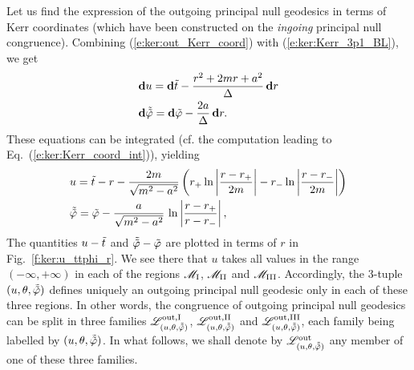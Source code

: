 Let us find
the expression of the outgoing principal null geodesics in terms of
Kerr coordinates (which have been constructed on the
\emph{ingoing} principal null congruence).
Combining (\ref{e:ker:out_Kerr_coord}) with (\ref{e:ker:Kerr_3p1_BL}),
we get
\begin{subequations}
\label{e:ker:out_Kerr_Kerr_3p1}
\begin{align}
& \mathbf{d} u = \mathbf{d} {\tilde t} - \frac{r^2 + 2m r + a^2}{\Delta} \, \mathbf{d} r \\
& \mathbf{d} \tilde{{\tilde\varphi}} = \mathbf{d} {\tilde\varphi} - \frac{2a}{\Delta}\, \mathbf{d} r .
\end{align}
\end{subequations}
These equations can be integrated (cf. the computation leading to Eq.~(\ref{e:ker:Kerr_coord_int})), yielding
\begin{subequations}
\label{e:ker:out_princ_geod}
\begin{align}
& u = {\tilde t} - r - \frac{2m}{\sqrt{m^2-a^2}} \left(
    r_+ \ln\left| \frac{r-r_+}{2m} \right|
    - r_- \ln\left| \frac{r-r_-}{2m} \right| \right) \label{e:ker:out_princ_geod_u} \\
&  \tilde{{\tilde\varphi}} = {\tilde\varphi} - \frac{a}{\sqrt{m^2-a^2}}\, \ln \left|
    \frac{r-r_+}{r-r_-} \right|  ,  \label{e:ker:out_princ_geod_ttph}
\end{align}
\end{subequations}
The quantities $u - {\tilde t}$ and $\tilde{{\tilde\varphi}} - {\tilde\varphi}$ are plotted in terms of
$r$ in Fig.~\ref{f:ker:u_ttphi_r}. We see there that $u$ takes all values
in the range $(-\infty,+\infty)$ in each of the regions $\mathscr{M}_{\rm I}$,
$\mathscr{M}_{\rm II}$ and $\mathscr{M}_{\rm III}$. Accordingly, the 3-tuple
$(u,\theta,\tilde{{\tilde\varphi}})$ defines uniquely an outgoing principal null geodesic
only in each of these three regions. In other words, the congruence
of outgoing principal null geodesics can be split in
three families
$\mathscr{L}^{\rm out,I}_{(u,\theta,\tilde{{\tilde\varphi}})}$,
$\mathscr{L}^{\rm out,II}_{(u,\theta,\tilde{{\tilde\varphi}})}$ and
$\mathscr{L}^{\rm out,III}_{(u,\theta,\tilde{{\tilde\varphi}})}$,
each family being labelled by $(u,\theta,\tilde{{\tilde\varphi}})$.
In what follows, we shall denote by $\mathscr{L}^{\rm out}_{(u,\theta,\tilde{{\tilde\varphi}})}$ any
member of one of these three families.


